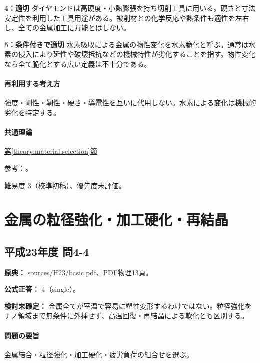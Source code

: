 \noindent\textbf{4：適切} ダイヤモンドは高硬度・小熱膨張を持ち切削工具に用いる。硬さと寸法安定性を利用した工具用途がある。被削材との化学反応や熱条件も適性を左右し、全ての金属加工に万能とはしない。\par

\noindent\textbf{5：条件付きで適切} 水素吸収による金属の物性変化を水素脆化と呼ぶ。通常は水素の侵入により延性や破壊抵抗などの機械特性が劣化することを指す。物性変化なら全て脆化とする広い定義は不十分である。\par

\paragraph{再利用する考え方} 強度・剛性・靭性・硬さ・導電性を互いに代用しない。水素による変化は機械的劣化を特定する。

\paragraph{共通理論} \hyperref[theory:material:selection]{第\ref*{theory:material:selection}節}

\par 参考：\cite{mit_material_elastic2000,stainless_definition2022,openstax_resistivity,nims_hydrogen2024,nims_diamond2007}。

\par 難易度 3（校準初稿）、優先度未評価。

\section{金属の粒径強化・加工硬化・再結晶}

\subsection{平成23年度 問4-4}
\label{q:h23-reg-basic-4-4}

\noindent\textbf{原典：} sources/H23/basic.pdf、PDF物理13頁。

\textbf{公式正答：} 4（single）。

\par\textbf{検討未確定：} 金属全てが室温で容易に塑性変形するわけではない。粒径強化をナノ領域まで無条件に外挿せず、高温回復・再結晶による軟化とも区別する。

\paragraph{問題の要旨} 金属結合・粒径強化・加工硬化・疲労負荷の組合せを選ぶ。

